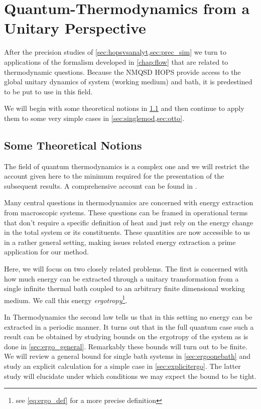 \chapter{Quantum-Thermodynamics from a Unitary Perspective}
\label{sec:therm_results}
After the precision studies of \cref{sec:hopsvsanalyt,sec:prec_sim} we
turn to applications of the formalism developed in \cref{chap:flow}
that are related to thermodynamic questions. Because the NMQSD HOPS provide access to the global
unitary dynamics of system (working medium) and bath, it is
predestined to be put to use in this field.

We will begin with some theoretical notions in \cref{sec:basic_thermo}
and then continue to apply them to some very simple cases in
\cref{sec:singlemod,sec:otto}.

\section{Some Theoretical Notions}
\label{sec:basic_thermo}
The field of quantum thermodynamics is a complex one and we will
restrict the account given here to the minimum required for the
presentation of the subsequent results. A comprehensive account can be
found in
\cite{Binder2018,Kurizki2021Dec,Talkner2020Oct,Vinjanampathy2016Oct}.

Many central questions in thermodynamics are concerned with energy
extraction from macroscopic systems. These questions can be framed in
operational terms that don't require a specific definition of heat and
just rely on the energy change in the total system or its
constituents. These quantities are now accessible to us in a rather
general setting, making issues related energy extraction a prime
application for our method.

Here, we will focus on two closely related problems. The first is
concerned with how much energy can be extracted through a unitary
transformation from a single infinite thermal bath coupled to an
arbitrary finite dimensional working medium. We call this energy
\emph{ergotropy}\footnote{see \cref{eq:ergo_def} for a more precise
  definition}.

In Thermodynamics the second law tells us that in this setting no
energy can be extracted in a periodic manner.  It turns out that in
the full quantum case such a result can be obtained by studying bounds
on the ergotropy of the system as is done in
\cref{sec:ergo_general}. Remarkably these bounds will turn out to be
finite. We will review a general bound for single bath systems in
\cref{sec:ergoonebath} and study an explicit calculation for a simple
case in \cref{sec:explicitergo}. The latter study will elucidate under
which conditions we may expect the bound to be tight.

